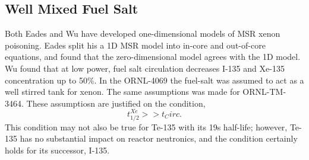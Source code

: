 \subsection{Well Mixed Fuel Salt}
Both Eades and Wu have developed one-dimensional models of MSR xenon poisoning. \cite{Eades16,Wu2017} Eades split his a 1D MSR model into in-core and out-of-core equations, and found that the zero-dimensional model agrees with the 1D model. Wu found that at low power, fuel salt circulation decreases I-135 and Xe-135 concentration up to 50\%. In the ORNL-4069 the fuel-salt was assumed to act as a well stirred tank for xenon. \cite[p. 21]{ORNL4069} The same assumptions was made for ORNL-TM-3464. \cite[p. 6]{ORNLTM3464}  These assumptiosn are justified on the condition,
\begin{equation}
    t_{1/2}^{Xe} >> t_Circ.
\end{equation}
This condition may not also be true for Te-135 with its 19s half-life; however, Te-135 has no substantial impact on reactor neutronics, and the condition certainly holds for its successor, I-135.